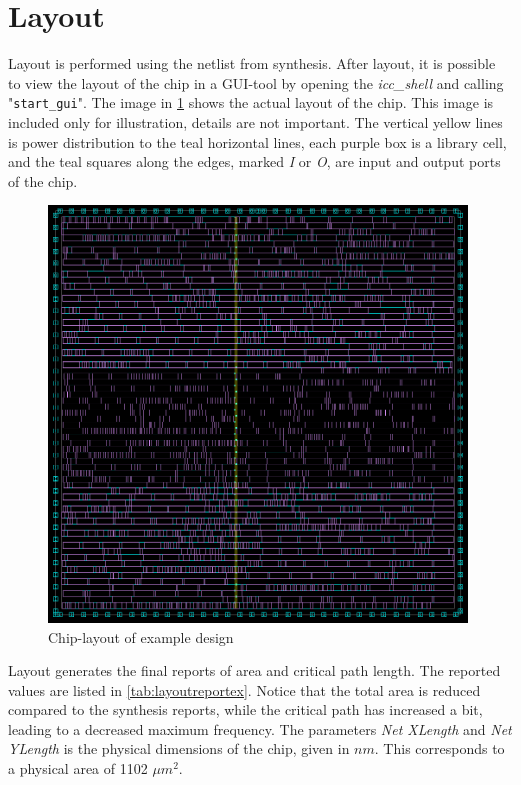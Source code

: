 \section{Layout}
Layout is performed using the netlist from synthesis. After layout, it is possible to view the layout of the chip in a GUI-tool by opening the \textit{icc\_shell} and calling "\verb!start_gui!". The image in \cref{fig:layoutcircuit} shows the actual layout of the chip. This image is included only for illustration, details are not important. The vertical yellow lines is power distribution to the teal horizontal lines, each purple box is a library cell, and the teal squares along the edges, marked \textit{I} or \textit{O}, are input and output ports of the chip. 
\begin{figure}[hbpt]
\centering
\includegraphics[width=0.99\textwidth]{../figs/LayoutCircuit.png}
\caption{\label{fig:layoutcircuit}Chip-layout of example design}
\end{figure}
Layout generates the final reports of area and critical path length. The reported values are listed in \cref{tab:layoutreportex}. Notice that the total area is reduced compared to the synthesis reports, while the critical path has increased a bit, leading to a decreased maximum frequency. The parameters \textit{Net XLength} and \textit{Net YLength} is the physical dimensions of the chip, given in $nm$. This corresponds to a physical area of 1102 $\mu m^2$.

